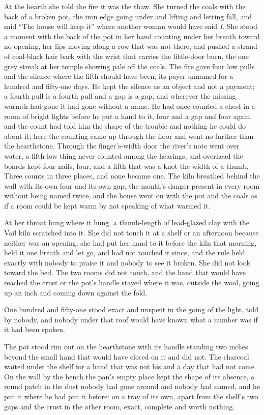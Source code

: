 At the hearth she told the fire it was the thaw. She turned the coals with the back of a broken pot, the iron edge going under and lifting and letting fall, and said “The house will keep it” where another woman would have said \emph{I}. She stood a moment with the back of the pot in her hand counting under her breath toward no opening, her lips moving along a row that was not there, and pushed a strand of coal-black hair back with the wrist that carries the little-door burn, the one grey streak at her temple showing pale off the coals. The fire gave four low pulls and the silence where the fifth should have been, its payer unnamed for a hundred and fifty-one days. He kept the silence as an object and not a payment; a fourth pull is a fourth pull and a gap is a gap, and wherever the missing warmth had gone it had gone without a name. He had once counted a chest in a room of bright lights before he put a hand to it, four and a gap and four again, and the count had told him the shape of the trouble and nothing he could do about it; here the counting came up through the floor and went no further than the hearthstone. Through the finger's-width door the river's note went over water, a fifth low thing never counted among the hearings, and overhead the boards kept four nails, four, and a fifth that was a knot the width of a thumb. Three counts in three places, and none became one. The kiln breathed behind the wall with its own four and its own gap, the month's danger present in every room without being named twice, and the house went on with the pot and the coals as if a room could be kept warm by not speaking of what warmed it.

At her throat  hung where it hung, a thumb-length of lead-glazed clay with the Vail kiln scratched into it. She did not touch it at a shelf or an afternoon because neither was an opening; she had put her hand to it before the kiln that morning, held it one breath and let go, and had not touched it since, and the rule held exactly with nobody to praise it and nobody to see it broken. She did not look toward the bed. The two rooms did not touch, and the hand that would have reached the crust or the pot's handle stayed where it was, outside the wool, going up an inch and coming down against the fold.

One hundred and fifty-one stood exact and unspent in the going of the light, told by nobody, and nobody under that roof would have known what a number was if it had been spoken.

The pot stood rim out on the hearthstone with its handle standing two inches beyond the small hand that would have closed on it and did not. The charcoal waited under the shelf for a hand that was not his and a day that had not come. On the wall by the bench the pan's empty place kept the shape of its absence, a round patch in the dust nobody had gone around and nobody had named, and he put it where he had put it before: on a tray of its own, apart from the shelf's two gaps and the crust in the other room, exact, complete and worth nothing.
